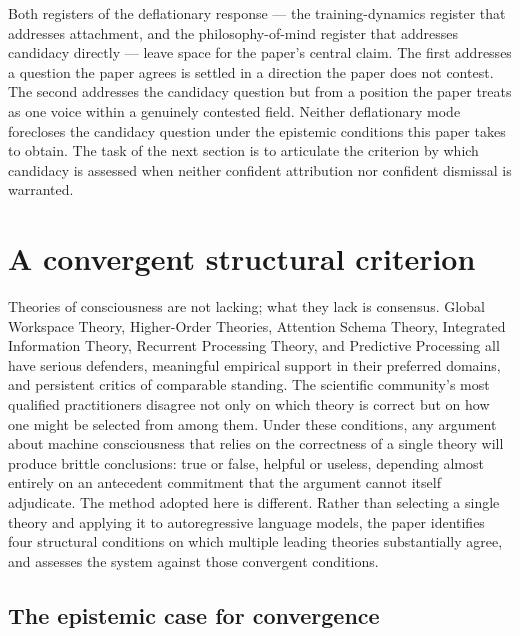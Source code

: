 \documentclass[11pt]{article}
\theoremstyle{foundation}
\begin{document}
Both registers of the deflationary response --- the training-dynamics register that addresses attachment, and the philosophy-of-mind register that addresses candidacy directly --- leave space for the paper's central claim. The first addresses a question the paper agrees is settled in a direction the paper does not contest. The second addresses the candidacy question but from a position the paper treats as one voice within a genuinely contested field. Neither deflationary mode forecloses the candidacy question under the epistemic conditions this paper takes to obtain. The task of the next section is to articulate the criterion by which candidacy is assessed when neither confident attribution nor confident dismissal is warranted.


\section{A convergent structural criterion}

Theories of consciousness are not lacking; what they lack is consensus. Global Workspace Theory, Higher-Order Theories, Attention Schema Theory, Integrated Information Theory, Recurrent Processing Theory, and Predictive Processing all have serious defenders, meaningful empirical support in their preferred domains, and persistent critics of comparable standing. The scientific community's most qualified practitioners disagree not only on which theory is correct but on how one might be selected from among them. Under these conditions, any argument about machine consciousness that relies on the correctness of a single theory will produce brittle conclusions: true or false, helpful or useless, depending almost entirely on an antecedent commitment that the argument cannot itself adjudicate. The method adopted here is different. Rather than selecting a single theory and applying it to autoregressive language models, the paper identifies four structural conditions on which multiple leading theories substantially agree, and assesses the system against those convergent conditions.

\subsection{The epistemic case for convergence}
\end{document}
